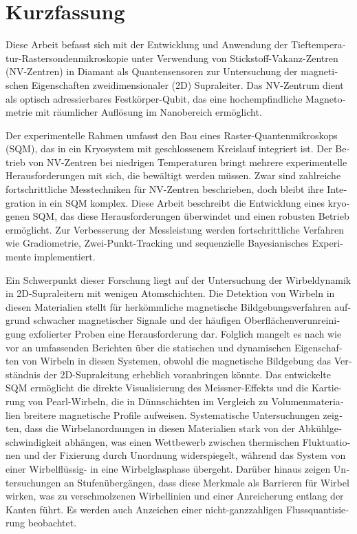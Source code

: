 \chapter*{Kurzfassung}
\begin{otherlanguage}{ngerman}
Diese Arbeit befasst sich mit der Entwicklung und Anwendung der Tieftemperatur-Rastersondenmikroskopie unter Verwendung von Stickstoff-Vakanz-Zentren (NV-Zentren) in Diamant als Quantensensoren zur Untersuchung der magnetischen Eigenschaften zweidimensionaler (2D) Supraleiter. Das NV-Zentrum dient als optisch adressierbares Festkörper-Qubit, das eine hochempfindliche Magnetometrie mit räumlicher Auflösung im Nanobereich ermöglicht. 

Der experimentelle Rahmen umfasst den Bau eines Raster-Quantenmikroskops (SQM), das in ein Kryosystem mit geschlossenem Kreislauf integriert ist. Der Betrieb von NV-Zentren bei niedrigen Temperaturen bringt mehrere experimentelle Herausforderungen mit sich, die bewältigt werden müssen. Zwar sind zahlreiche fortschrittliche Messtechniken für NV-Zentren beschrieben, doch bleibt ihre Integration in ein SQM komplex. Diese Arbeit beschreibt die Entwicklung eines kryogenen SQM, das diese Herausforderungen überwindet und einen robusten Betrieb ermöglicht. Zur Verbesserung der Messleistung werden fortschrittliche Verfahren wie Gradiometrie, Zwei-Punkt-Tracking und sequenzielle Bayesianisches Experimente implementiert.

Ein Schwerpunkt dieser Forschung liegt auf der Untersuchung der Wirbeldynamik in 2D-Supraleitern mit wenigen Atomschichten. Die Detektion von Wirbeln in diesen Materialien stellt für herkömmliche magnetische Bildgebungsverfahren aufgrund schwacher magnetischer Signale und der häufigen Oberflächenverunreinigung exfolierter Proben eine Herausforderung dar. Folglich mangelt es nach wie vor an umfassenden Berichten über die statischen und dynamischen Eigenschaften von Wirbeln in diesen Systemen, obwohl die magnetische Bildgebung das Verständnis der 2D-Supraleitung erheblich voranbringen könnte. Das entwickelte SQM ermöglicht die direkte Visualisierung des Meissner-Effekts und die Kartierung von Pearl-Wirbeln, die in Dünnschichten im Vergleich zu Volumenmaterialien breitere magnetische Profile aufweisen. Systematische Untersuchungen zeigten, dass die Wirbelanordnungen in diesen Materialien stark von der Abkühlgeschwindigkeit abhängen, was einen Wettbewerb zwischen thermischen Fluktuationen und der Fixierung durch Unordnung widerspiegelt, während das System von einer Wirbelflüssig- in eine Wirbelglasphase übergeht. Darüber hinaus zeigen Untersuchungen an Stufenübergängen, dass diese Merkmale als Barrieren für Wirbel wirken, was zu verschmolzenen Wirbellinien und einer Anreicherung entlang der Kanten führt. Es werden auch Anzeichen einer nicht-ganzzahligen Flussquantisierung beobachtet.


\end{otherlanguage}
